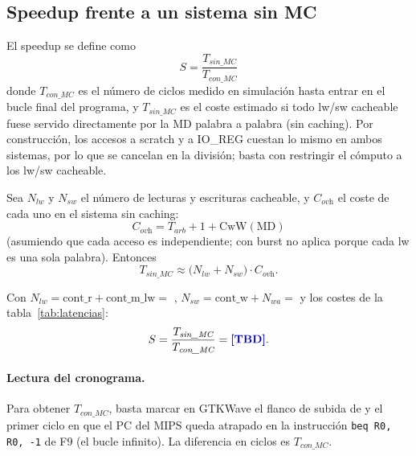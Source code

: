 \subsection{Speedup frente a un sistema sin MC}

El speedup se define como
\begin{equation}
S = \frac{T_\textit{sin\_MC}}{T_\textit{con\_MC}}
\end{equation}
donde $T_\textit{con\_MC}$ es el n\'umero de ciclos medido en simulaci\'on hasta
entrar en el bucle final del programa, y $T_\textit{sin\_MC}$ es el coste estimado
si todo lw/sw cacheable fuese servido directamente por la MD palabra a palabra
(sin caching). Por construcci\'on, los accesos a scratch y a IO\_REG cuestan lo
mismo en ambos sistemas, por lo que se cancelan en la divisi\'on; basta con
restringir el c\'omputo a los lw/sw cacheable.

Sea $N_\textit{lw}$ y $N_\textit{sw}$ el n\'umero de lecturas y escrituras
cacheable, y $C_\textit{ovh}$ el coste de cada uno en el sistema sin caching:
$$
C_\textit{ovh} = T_\textit{arb} + 1 + \mathrm{CwW(MD)}
$$
(asumiendo que cada acceso es independiente; con burst no aplica porque cada lw
es una sola palabra). Entonces
\begin{equation}
T_\textit{sin\_MC} \approx \bigl(N_\textit{lw} + N_\textit{sw}\bigr)\cdot C_\textit{ovh}.
\end{equation}

Con $N_\textit{lw} = \mathrm{cont\_r}+\mathrm{cont\_m\_lw}=$ ,
$N_\textit{sw} = \mathrm{cont\_w}+N_\textit{wa} =$  y los costes de la
tabla~\ref{tab:latencias}:
$$
S = \frac{T_\textit{sin\_MC}}{T_\textit{con\_MC}} = \dato{TBD}.
$$

\paragraph{Lectura del cronograma.} Para obtener $T_\textit{con\_MC}$, basta marcar
en GTKWave el flanco de subida de  y el primer ciclo en que el PC del
MIPS queda atrapado en la instrucci\'on \texttt{beq R0, R0, -1} de F9 (el bucle
infinito). La diferencia en ciclos es $T_\textit{con\_MC}$.
